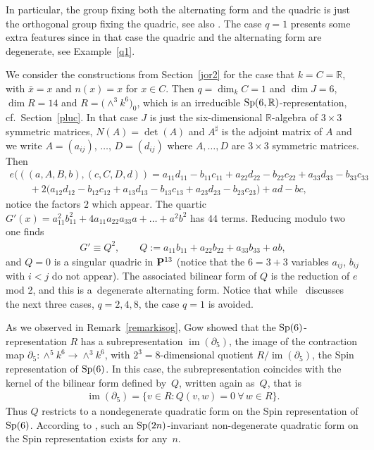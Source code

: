 \documentclass[pdftex]{sigma}
\newcommand{\RR}{{\mathbb R}}
\newcommand{\PP}{{\bf P}}
\newcommand{\im}{\operatorname{im}}
\numberwithin{equation}{section}
\begin{document}
In particular, the group fixing both the alternating form and the quadric is just the orthogonal group fixing the quadric, see also \cite[Remark~20]{Kru}. The case $q=1$ presents some extra features since in that case the quadric and the alternating form are degenerate, see Example~\ref{q1}.

\begin{Example}[$q=1$]\label{q1} We consider the constructions from Section~\ref{jor2} for the case that $k=C=\RR$, with $\bar{x}=x$ and $n(x)=x$ for $x\in C$. Then $q=\dim_kC=1$ and $\dim J=6$, $\dim R=14$ and $R=\big({\wedge}^3k^6\big)_0$, which is an irreducible ${\rm Sp}(6,\RR)$-representation, cf.\ Section~\ref{pluc}. In that case $J$ is just the six-dimensional $\RR$-algebra of $3\times 3$ symmetric matrices, $N(A)=\det(A)$ and $A^\sharp$ is the adjoint matrix of $A$ and we write $A=(a_{ij})$, $\ldots$, $D=(d_{ij})$ where $A,\ldots,D$ are $3\times 3$ symmetric matrices. Then
\begin{gather*}
e(((a,A,B,b),(c,C,D,d))=a_{11}d_{11 }- b_{11}c_{11} + a_{22}d_{22 }- b_{22}c_{22} +a_{33}d_{33 }- b_{33}c_{33} \\
\qquad{} +2\bigl(a_{12}d_{12 }- b_{12}c_{12} + a_{13}d_{13 }- b_{13}c_{13} + a_{23}d_{23} - b_{23}c_{23 }) + ad - bc,
\end{gather*}
notice the factors $2$ which appear. The quartic $G'(x)=a_{11}^2b_{11}^2 + 4a_{11}a_{22}a_{33}a+\dots+a^2b^2$ has $44$ terms. Reducing modulo two one finds
\begin{gather*}
G' \equiv Q^2,\qquad Q := a_{11}b_{11} + a_{22}b_{22} + a_{33}b_{33} + ab,
\end{gather*}
and $Q=0$ is a singular quadric in $\PP^{13}$ (notice that the $6=3+3$ variables $a_{ij}$, $b_{ij}$ with $i<j$ do not appear). The associated bilinear form of $Q$ is the reduction of $e$ mod 2, and this is a~degenerate alternating form. Notice that while~\cite{Kru} discusses the next three cases, $q=2,4,8$, the case $q=1$ is avoided.

As we observed in Remark~\ref{remarkisog}, Gow showed that the ${\rm Sp}(6)$-representation $R$ has a subrepresentation $\im(\partial_{5})$, the image of the contraction map $\partial_5\colon \wedge^5 k^6 \rightarrow\wedge^3k^6$, with $2^3=8$-dimensional quotient $R/\im(\partial_5)$, the Spin representation of ${\rm Sp}(6)$. In this case, the subrepresentation coincides with the kernel of the bilinear form defined by~$Q$, written again as~$Q$, that is
\begin{gather*}
\im(\partial_{5}) = \{ v\in R\colon Q(v,w)=0\ \forall\, w\in R \}.
\end{gather*}
Thus $Q$ restricts to a nondegenerate quadratic form on the Spin representation of ${\rm Sp}(6)$. According to \cite[Section~4]{Gow}, such an ${\rm Sp}(2n)$-invariant non-degenerate quadratic form on the Spin representation exists for any~$n$.
\end{Example}
\end{document}
